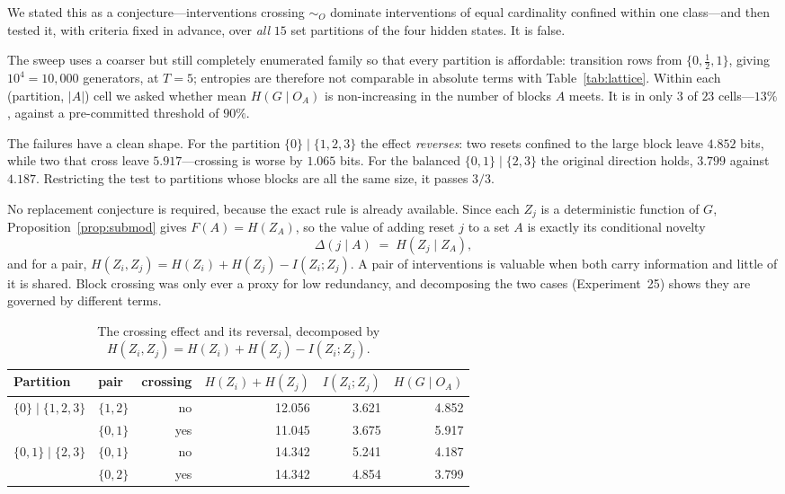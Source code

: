 \documentclass[11pt]{article}
\begin{document}
We stated this as a conjecture---interventions crossing $\sim_O$ dominate interventions of
equal cardinality confined within one class---and then tested it, with criteria fixed in
advance, over \emph{all} $15$ set partitions of the four hidden states. It is false.

The sweep uses a coarser but still completely enumerated family so that every partition is
affordable: transition rows from $\{0,\frac12,1\}$, giving $10^4 = 10{,}000$ generators, at
$T=5$; entropies are therefore not comparable in absolute terms with
Table~\ref{tab:lattice}. Within each (partition, $|A|$) cell we asked whether mean
$H(G \mid O_A)$ is non-increasing in the number of blocks $A$ meets. It is in only
$3$ of $23$ cells---$13\%$, against a pre-committed threshold of $90\%$.

The failures have a clean shape. For the partition $\{0\} \mid \{1,2,3\}$ the effect
\emph{reverses}: two resets confined to the large block leave $4.852$ bits, while two that
cross leave $5.917$---crossing is worse by $1.065$ bits. For the balanced
$\{0,1\} \mid \{2,3\}$ the original direction holds, $3.799$ against $4.187$. Restricting
the test to partitions whose blocks are all the same size, it passes $3/3$.

No replacement conjecture is required, because the exact rule is already available.
Since each $Z_j$ is a deterministic function of $G$, Proposition~\ref{prop:submod} gives
$F(A) = H(Z_A)$, so the value of adding reset $j$ to a set $A$ is exactly its conditional
novelty
\[
  \Delta(j \mid A) \;=\; H(Z_j \mid Z_A),
\]
and for a pair, $H(Z_i,Z_j) = H(Z_i) + H(Z_j) - I(Z_i;Z_j)$. A pair of interventions is
valuable when both carry information and little of it is shared. Block crossing was only
ever a proxy for low redundancy, and decomposing the two cases (Experiment~25) shows they
are governed by different terms.

\begin{table}[h]
\centering
\begin{tabular}{llrrrr}
\toprule
Partition & pair & crossing & $H(Z_i){+}H(Z_j)$ & $I(Z_i;Z_j)$ & $H(G \mid O_A)$ \\
\midrule
$\{0\}\mid\{1,2,3\}$ & $\{1,2\}$ & no  & 12.056 & 3.621 & 4.852 \\
                       & $\{0,1\}$ & yes & 11.045 & 3.675 & 5.917 \\
\addlinespace
$\{0,1\}\mid\{2,3\}$ & $\{0,1\}$ & no  & 14.342 & 5.241 & 4.187 \\
                        & $\{0,2\}$ & yes & 14.342 & 4.854 & 3.799 \\
\bottomrule
\end{tabular}
\caption{The crossing effect and its reversal, decomposed by
$H(Z_i,Z_j) = H(Z_i) + H(Z_j) - I(Z_i;Z_j)$.}
\label{tab:decomp}
\end{table}
\end{document}
